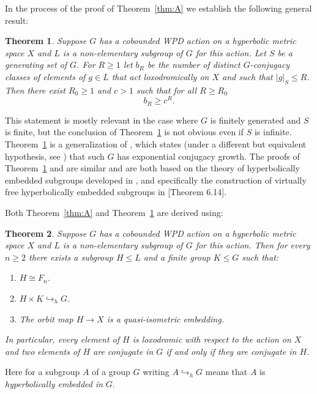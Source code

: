 \documentclass[11pt,letterpaper]{amsart}
\newtheorem{thm}{Theorem}[section]
\theoremstyle{definition}
\theoremstyle{remark}
\newcommand{\h}{\hookrightarrow _h }
\begin{document}
In the process of the proof of Theorem~\ref{thm:A} we establish the following general result:
\begin{thm}\label{thm:B}
Suppose $G$ has a cobounded WPD action on a hyperbolic metric space $X$ and $L$ is a non-elementary subgroup of $G$ for this action. Let $S$ be a generating set of $G$. 
For $R\ge 1$ let $b_R$ be the number of distinct $G$-conjugacy classes of elements of $g\in L$ that act loxodromically on $X$ and such that $|g|_S\le R$. Then there exist $R_0\ge 1$ and $c>1$ such that for all $R\ge R_0$
\[
b_R\ge c^R.
\]
\end{thm}
This statement is mostly relevant in the case where $G$ is finitely generated and $S$ is finite, but the conclusion of Theorem~\ref{thm:B} is not obvious even if $S$ is infinite. Theorem~\ref{thm:B} is a generalization of \cite[Theorem 1.1]{HO}, which states (under a different but equivalent hypothesis, see \cite{O}) that such $G$ has exponential conjugacy growth. The proofs of Theorem~\ref{thm:B} and \cite[Theorem 1.1]{HO} are similar and are both based on the theory of hyperbolically embedded subgroups developed in \cite{DGO}, and specifically the construction of virtually free hyperbolically embedded subgroups in [Theorem 6.14]\cite{DGO}.


Both Theorem~\ref{thm:A} and Theorem~\ref{thm:B} are derived using:
\begin{thm}\label{thm:C}
Suppose $G$ has a cobounded WPD action on a hyperbolic metric space $X$ and $L$ is a non-elementary subgroup of $G$ for this action. Then for every $n\ge 2$ there exists a subgroup $H\le L$ and a finite group $K\leq G$ such that: 
\begin{enumerate}
\item $H\cong F_n$.
\item $H\times K\h G$.
\item The orbit map $H\to X$ is a quasi-isometric embedding.
\end{enumerate}

In particular, every element of $H$ is loxodromic with respect to the action on $X$ and two elements of $H$ are conjugate in $G$ if and only if they are conjugate in $H$.
\end{thm}
Here for a subgroup $A$ of a group $G$ writing $A\h G$ means that $A$ is \emph{hyperbolically embedded in} $G$. 
\end{document}
